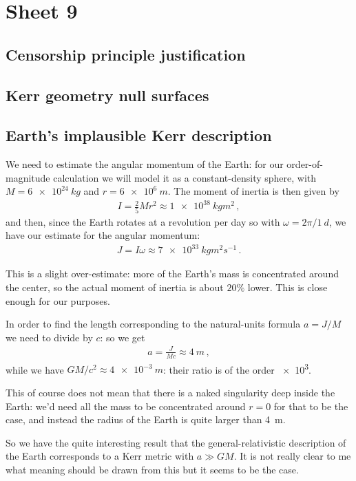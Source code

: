 \documentclass[main.tex]{subfiles}
\begin{document}
\section{Sheet 9}

\subsection{Censorship principle justification}

\subsection{Kerr geometry null surfaces}

\subsection{Earth's implausible Kerr description}

We need to estimate the angular momentum of the Earth: for our order-of-magnitude calculation we will model it as a constant-density sphere, with \(M = \SI{6e+24}{kg}\) and \(r = \SI{6e6}{m}\). The moment of inertia is then given by 
%
\begin{align}
  I = \frac{2}{5} M r^{2} \approx \SI{1e38}{kg m^2}
\,,
\end{align}
%
and then, since the Earth rotates at a revolution per day so with \(\omega = 2\pi / \SI{1}{d}\), we have our estimate for the angular momentum: 
%
\begin{align}
  J = I \omega 
  \approx \SI{7e+33}{kg m^2 s^{-1}}
\,.
\end{align}

This is a slight over-estimate: more of the Earth's mass is concentrated around the center, so the actual moment of inertia is about \(20\%\) lower. This is close enough for our purposes. 

In order to find the length corresponding to the natural-units formula \(a = J/M\) we need to divide by \(c\): so we get 
%
\begin{align}
  a = \frac{J}{Mc} \approx \SI{4}{m}
\,,
\end{align}
%
while we have \(GM/c^2 \approx \SI{4e-3}{m}\): their ratio is of the order \num{e3}.

This of course does not mean that there is a naked singularity deep inside the Earth: we'd need all the mass to be concentrated around \(r=0\) for that to be the case, and instead the radius of the Earth is quite larger than \SI{4}{m}.

So we have the quite interesting result that the general-relativistic description of the Earth corresponds to a Kerr metric with \(a \gg GM\). It is not really clear to me what meaning should be drawn from this but it seems to be the case. 
\end{document}

